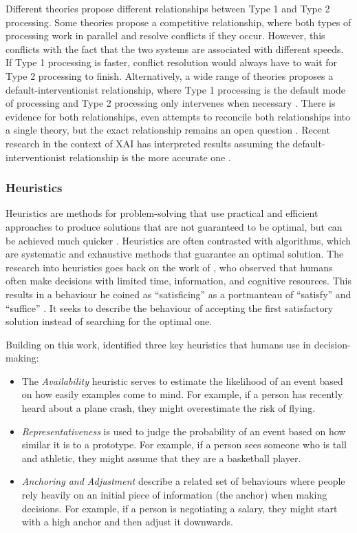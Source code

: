 Different theories propose different relationships between Type 1 and Type 2 processing. Some theories propose a competitive relationship, where both types of processing work in parallel and resolve conflicts if they occur. However, this conflicts with the fact that the two systems are associated with different speeds. If Type 1 processing is faster, conflict resolution would always have to wait for Type 2 processing to finish. Alternatively, a wide range of theories proposes a default-interventionist relationship, where Type 1 processing is the default mode of processing and Type 2 processing only intervenes when necessary \parencite{Evans2013}. There is evidence for both relationships, even attempts to reconcile both relationships into a single theory, but the exact relationship remains an open question \parencite{Evans2013, Djulbegovic2012}. Recent research in the context of \ac{XAI} has interpreted results assuming the default-interventionist relationship is the more accurate one \parencite{Jussupow2021, Shin2021}.

\subsubsection{Heuristics} \label{sssec:heuristics}

Heuristics are methods for problem-solving that use practical and efficient approaches to produce solutions that are not guaranteed to be optimal, but can be achieved much quicker \parencite{Gigerenzer2011}. Heuristics are often contrasted with algorithms, which are systematic and exhaustive methods that guarantee an optimal solution. The research into heuristics goes back on the work of \textcite{Simon1955}, who observed that humans often make decisions with limited time, information, and cognitive resources. This results in a behaviour he coined as “satisficing” as a portmanteau of “satisfy” and “suffice” \parencite{Simon1956}. It seeks to describe the behaviour of accepting the first satisfactory solution instead of searching for the optimal one.

Building on this work, \textcite{Tversky1974} identified three key heuristics that humans use in decision-making:

\begin{itemize}
    \item The \textit{Availability} heuristic serves to estimate the likelihood of an event based on how easily examples come to mind. For example, if a person has recently heard about a plane crash, they might overestimate the risk of flying.
    \item \textit{Representativeness} is used to judge the probability of an event based on how similar it is to a prototype. For example, if a person sees someone who is tall and athletic, they might assume that they are a basketball player.
    \item \textit{Anchoring and Adjustment} describe a related set of behaviours where people rely heavily on an initial piece of information (the anchor) when making decisions. For example, if a person is negotiating a salary, they might start with a high anchor and then adjust it downwards.
\end{itemize}

